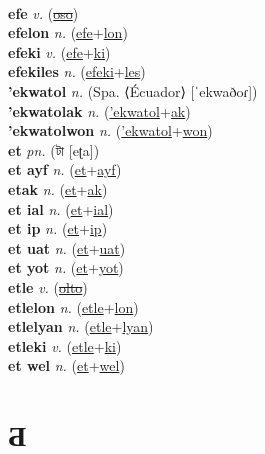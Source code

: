  \label{'espaketti} \\
\textbf{efe} \textit{v.} (\hyperref[oso]{\sout{oso}})
 \label{efe} \\
\textbf{efelon} \textit{n.} (\hyperref[efe]{efe}+\hyperref[lon]{lon})
 \label{efelon} \\
\textbf{efeki} \textit{v.} (\hyperref[efe]{efe}+\hyperref[ki]{ki})
 \label{efeki} \\
\textbf{efekiles} \textit{n.} (\hyperref[efeki]{efeki}+\hyperref[les]{les})
 \label{efekiles} \\
\textbf{'ekwatol} \textit{n.} (Spa. ⟨Écuador⟩ [ˈekwaðoɾ])
 \label{'ekwatol} \\
\textbf{'ekwatolak} \textit{n.} (\hyperref['ekwatol]{'ekwatol}+\hyperref[ak]{ak})
 \label{'ekwatolak} \\
\textbf{'ekwatolwon} \textit{n.} (\hyperref['ekwatol]{'ekwatol}+\hyperref[won]{won})
 \label{'ekwatolwon} \\
\textbf{et} \textit{pn.} ({\bengali{}টা} [eʈa])
 \label{et} \\
\textbf{et ayf} \textit{n.} (\hyperref[et]{et}+\hyperref[ayf]{ayf})
 \label{et ayf} \\
\textbf{etak} \textit{n.} (\hyperref[et]{et}+\hyperref[ak]{ak})
 \label{etak} \\
\textbf{et ial} \textit{n.} (\hyperref[et]{et}+\hyperref[ial]{ial})
 \label{et ial} \\
\textbf{et ip} \textit{n.} (\hyperref[et]{et}+\hyperref[ip]{ip})
 \label{et ip} \\
\textbf{et uat} \textit{n.} (\hyperref[et]{et}+\hyperref[uat]{uat})
 \label{et uat} \\
\textbf{et yot} \textit{n.} (\hyperref[et]{et}+\hyperref[yot]{yot})
 \label{et yot} \\
\textbf{etle} \textit{v.} (\hyperref[olto]{\sout{olto}})
 \label{etle} \\
\textbf{etlelon} \textit{n.} (\hyperref[etle]{etle}+\hyperref[lon]{lon})
 \label{etlelon} \\
\textbf{etlelyan} \textit{n.} (\hyperref[etle]{etle}+\hyperref[lyan]{lyan})
 \label{etlelyan} \\
\textbf{etleki} \textit{v.} (\hyperref[etle]{etle}+\hyperref[ki]{ki})
 \label{etleki} \\
\textbf{et wel} \textit{n.} (\hyperref[et]{et}+\hyperref[wel]{wel})
 \label{et wel} 

\section{Ƌ}

